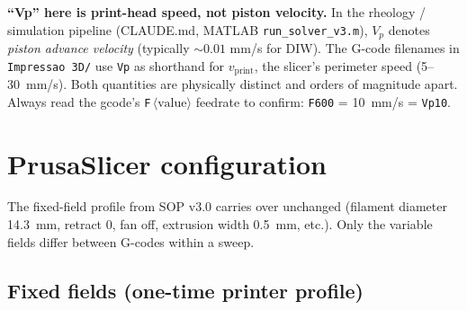 \documentclass[11pt,a4paper]{article}
\begin{document}
\begin{warningbox}
\textbf{``Vp'' here is print-head speed, not piston velocity.}
In the rheology / simulation pipeline (CLAUDE.md, MATLAB
\texttt{run\_solver\_v3.m}), $V_p$ denotes \emph{piston advance
velocity} (typically $\sim 0.01$ mm/s for DIW). The G-code
filenames in \texttt{Impressao 3D/} use \texttt{Vp} as shorthand
for $v_\mathrm{print}$, the slicer's perimeter speed (5--30~mm/s).
Both quantities are physically distinct and orders of magnitude
apart. Always read the gcode's \texttt{F$\,\langle\mathrm{value}\rangle$}
feedrate to confirm: \texttt{F600} = 10~mm/s = \texttt{Vp10}.
\end{warningbox}

\section{PrusaSlicer configuration}
\label{sec:slicer}

The fixed-field profile from SOP v3.0 carries over unchanged
(filament diameter 14.3~mm, retract 0, fan off, extrusion width
0.5~mm, etc.). Only the variable fields differ between G-codes
within a sweep.

\subsection{Fixed fields (one-time printer profile)}
\end{document}
